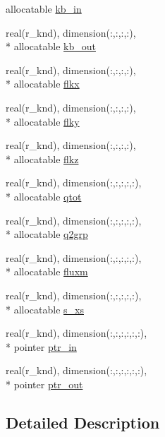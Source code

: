 \begin{DoxyCompactItemize}
allocatable \hyperlink{classsolvar__module_a7e928ad260554afcde0e80147b5176dd}{kb\-\_\-in}
\item 
real(r\-\_\-knd), dimension(\-:,\-:,\-:,\-:), \\*
allocatable \hyperlink{classsolvar__module_a500e3ed7d4b1812584b2561e844a1a91}{kb\-\_\-out}
\item 
real(r\-\_\-knd), dimension(\-:,\-:,\-:,\-:), \\*
allocatable \hyperlink{classsolvar__module_a84eaccfc41511c5cd088f7d03d5f41c1}{flkx}
\item 
real(r\-\_\-knd), dimension(\-:,\-:,\-:,\-:), \\*
allocatable \hyperlink{classsolvar__module_a3fbb689b872fa887a3ecdd93d9a97ecf}{flky}
\item 
real(r\-\_\-knd), dimension(\-:,\-:,\-:,\-:), \\*
allocatable \hyperlink{classsolvar__module_ac1a71548938a72b9fa42b45c11bca3a1}{flkz}
\item 
real(r\-\_\-knd), dimension(\-:,\-:,\-:,\-:,\-:), \\*
allocatable \hyperlink{classsolvar__module_aea3d3733a1576348496e9e070924ad62}{qtot}
\item 
real(r\-\_\-knd), dimension(\-:,\-:,\-:,\-:,\-:), \\*
allocatable \hyperlink{classsolvar__module_a251ab88a6dab1f3da07d22096331b932}{q2grp}
\item 
real(r\-\_\-knd), dimension(\-:,\-:,\-:,\-:,\-:), \\*
allocatable \hyperlink{classsolvar__module_a0e9cb7f402640f1adaeeba1ca33718eb}{fluxm}
\item 
real(r\-\_\-knd), dimension(\-:,\-:,\-:,\-:,\-:), \\*
allocatable \hyperlink{classsolvar__module_ab36a684b0d77a635a3eb402da029b7b7}{s\-\_\-xs}
\item 
real(r\-\_\-knd), dimension(\-:,\-:,\-:,\-:,\-:,\-:), \\*
pointer \hyperlink{classsolvar__module_ac95d5a5e2f90e8f827801c3616afd3cc}{ptr\-\_\-in}
\item 
real(r\-\_\-knd), dimension(\-:,\-:,\-:,\-:,\-:,\-:), \\*
pointer \hyperlink{classsolvar__module_aaa582c1084c73e20d39d834455a825d1}{ptr\-\_\-out}
\end{DoxyCompactItemize}


\subsection{Detailed Description}



